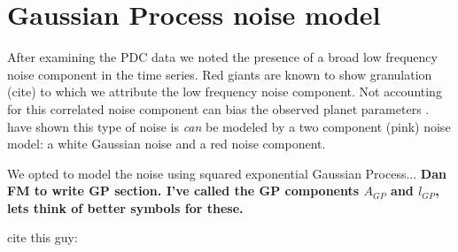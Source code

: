 \documentclass[apjl]{emulateapj}
\begin{document}
\section{Gaussian Process noise model}
After examining the PDC data we noted the presence of a broad low frequency noise component in the time series. Red giants are known to show granulation (cite) to which we attribute the low frequency noise component. Not accounting for this correlated noise component can bias the observed planet parameters \citep{carter09}. \citet{huber13b} have shown this type of noise is \emph{can} be modeled by a two component (pink) noise model: a white Gaussian noise and a red noise component. 

We opted to model the noise using squared exponential Gaussian Process... \textbf{Dan FM to write GP section. I've called the GP components $A_{GP}$ and $l_{GP}$, lets think of better symbols for these.}

cite this guy: \citet{ambikasaran14}





\end{document}
